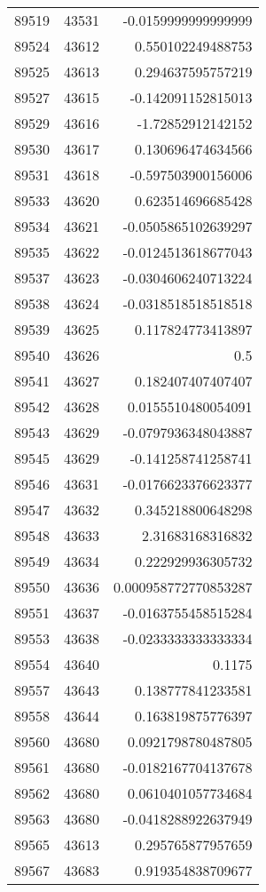 \begin{tabular}{r | r | r}
89519 & 43531 & -0.0159999999999999 \\
89524 & 43612 & 0.550102249488753 \\
89525 & 43613 & 0.294637595757219 \\
89527 & 43615 & -0.142091152815013 \\
89529 & 43616 & -1.72852912142152 \\
89530 & 43617 & 0.130696474634566 \\
89531 & 43618 & -0.597503900156006 \\
89533 & 43620 & 0.623514696685428 \\
89534 & 43621 & -0.0505865102639297 \\
89535 & 43622 & -0.0124513618677043 \\
89537 & 43623 & -0.0304606240713224 \\
89538 & 43624 & -0.0318518518518518 \\
89539 & 43625 & 0.117824773413897 \\
89540 & 43626 & 0.5 \\
89541 & 43627 & 0.182407407407407 \\
89542 & 43628 & 0.0155510480054091 \\
89543 & 43629 & -0.0797936348043887 \\
89545 & 43629 & -0.141258741258741 \\
89546 & 43631 & -0.0176623376623377 \\
89547 & 43632 & 0.345218800648298 \\
89548 & 43633 & 2.31683168316832 \\
89549 & 43634 & 0.222929936305732 \\
89550 & 43636 & 0.000958772770853287 \\
89551 & 43637 & -0.0163755458515284 \\
89553 & 43638 & -0.0233333333333334 \\
89554 & 43640 & 0.1175 \\
89557 & 43643 & 0.138777841233581 \\
89558 & 43644 & 0.163819875776397 \\
89560 & 43680 & 0.0921798780487805 \\
89561 & 43680 & -0.0182167704137678 \\
89562 & 43680 & 0.0610401057734684 \\
89563 & 43680 & -0.0418288922637949 \\
89565 & 43613 & 0.295765877957659 \\
89567 & 43683 & 0.919354838709677 \\

\end{tabular}
